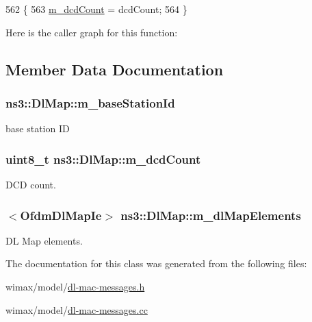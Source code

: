 \begin{DoxyCode}
562 \{
563   \hyperlink{classns3_1_1DlMap_a631acfeb23dc7ce671cc115045d93d46}{m\_dcdCount} = dcdCount;
564 \}
\end{DoxyCode}


Here is the caller graph for this function\+:




\subsection{Member Data Documentation}
\subsubsection[{\texorpdfstring{m\+\_\+base\+Station\+Id}{m_baseStationId}}]{ ns3\+::\+Dl\+Map\+::m\+\_\+base\+Station\+Id\hspace{0.3cm}{\ttfamily [private]}}\hypertarget{classns3_1_1DlMap_ad5d3b24b4d6cc443d13914c16240ab35}{}\label{classns3_1_1DlMap_ad5d3b24b4d6cc443d13914c16240ab35}


base station ID 

\subsubsection[{\texorpdfstring{m\+\_\+dcd\+Count}{m_dcdCount}}]{\setlength{\rightskip}{0pt plus 5cm}uint8\+\_\+t ns3\+::\+Dl\+Map\+::m\+\_\+dcd\+Count\hspace{0.3cm}{\ttfamily [private]}}\hypertarget{classns3_1_1DlMap_a631acfeb23dc7ce671cc115045d93d46}{}\label{classns3_1_1DlMap_a631acfeb23dc7ce671cc115045d93d46}


D\+CD count. 

\subsubsection[{\texorpdfstring{m\+\_\+dl\+Map\+Elements}{m_dlMapElements}}]{$<${\bf Ofdm\+Dl\+Map\+Ie}$>$ ns3\+::\+Dl\+Map\+::m\+\_\+dl\+Map\+Elements\hspace{0.3cm}{\ttfamily [private]}}\hypertarget{classns3_1_1DlMap_a40f1f91916deac28501881ac057ecfab}{}\label{classns3_1_1DlMap_a40f1f91916deac28501881ac057ecfab}


DL Map elements. 



The documentation for this class was generated from the following files\+:\begin{DoxyCompactItemize}
\item 
wimax/model/\hyperlink{dl-mac-messages_8h}{dl-\/mac-\/messages.\+h}\item 
wimax/model/\hyperlink{dl-mac-messages_8cc}{dl-\/mac-\/messages.\+cc}\end{DoxyCompactItemize}
